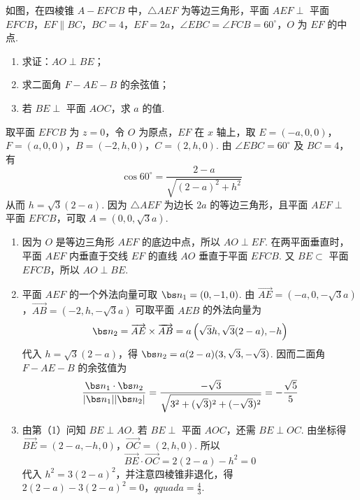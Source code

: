 \begin{problem}
如图，在四棱锥 \(A-EFCB\) 中，\(\triangle AEF\) 为等边三角形，平面 \(AEF \perp\) 平面 \(EFCB\)，\(EF \parallel BC\)，\(BC=4\)，\(EF=2a\)，\(\angle EBC=\angle FCB=60^\circ\)，\(O\) 为 \(EF\) 的中点.

\begin{enumerate}
\item 求证：\(AO \perp BE\)；
\item 求二面角 \(F-AE-B\) 的余弦值；
\item 若 \(BE \perp\) 平面 \(AOC\)，求 \(a\) 的值.
\end{enumerate}

\end{problem}

\begin{solution}
取平面 \(EFCB\) 为 \(z=0\)，令 \(O\) 为原点，\(EF\) 在 \(x\) 轴上，取
\(E=(-a,0,0)\)，\(F=(a,0,0)\)，\(B=(-2,h,0)\)，\(C=(2,h,0)\).
由 \(\angle EBC=60^\circ\) 及 \(BC=4\)，有
\[
\cos60^\circ=\frac{2-a}{\sqrt{(2-a)^2+h^2}}
\]
从而 \(h=\sqrt3(2-a)\). 因为 \(\triangle AEF\) 为边长 \(2a\) 的等边三角形，且平面 \(AEF\perp\) 平面 \(EFCB\)，可取 \(A=(0,0,\sqrt3a)\).

\begin{enumerate}
\item 因为 \(O\) 是等边三角形 \(AEF\) 的底边中点，所以 \(AO\perp EF\). 在两平面垂直时，平面 \(AEF\) 内垂直于交线 \(EF\) 的直线 \(AO\) 垂直于平面 \(EFCB\). 又 \(BE\subset\) 平面 \(EFCB\)，所以 \(AO\perp BE\).
\item 平面 \(AEF\) 的一个外法向量可取 \(\bs n_1=(0,-1,0)\). 由
\(\overrightarrow{AE}=(-a,0,-\sqrt3a)\)，\(\overrightarrow{AB}=(-2,h,-\sqrt3a)\)
可取平面 \(AEB\) 的外法向量为
\[
\bs n_2=\overrightarrow{AE}\times\overrightarrow{AB}
=a\left(\sqrt3h,\sqrt3(2-a),-h\right)
\]
代入 \(h=\sqrt3(2-a)\)，得 \(\bs n_2=a(2-a)(3,\sqrt3,-\sqrt3)\). 因而二面角 \(F-AE-B\) 的余弦值为
\[
\frac{\bs n_1\cdot\bs n_2}{|\bs n_1||\bs n_2|}
=\frac{-\sqrt3}{\sqrt{3^2+(\sqrt3)^2+(-\sqrt3)^2}}
=-\frac{\sqrt5}{5}
\]
\item 由第（1）问知 \(BE\perp AO\). 若 \(BE\perp\) 平面 \(AOC\)，还需 \(BE\perp OC\). 由坐标得
\(\overrightarrow{BE}=(2-a,-h,0)\)，\(\overrightarrow{OC}=(2,h,0)\).
所以
\[
\overrightarrow{BE}\cdot\overrightarrow{OC}=2(2-a)-h^2=0
\]
代入 \(h^2=3(2-a)^2\)，并注意四棱锥非退化，得
\(2(2-a)-3(2-a)^2=0\)，\(qquad a=\frac43\).
\end{enumerate}
\end{solution}

